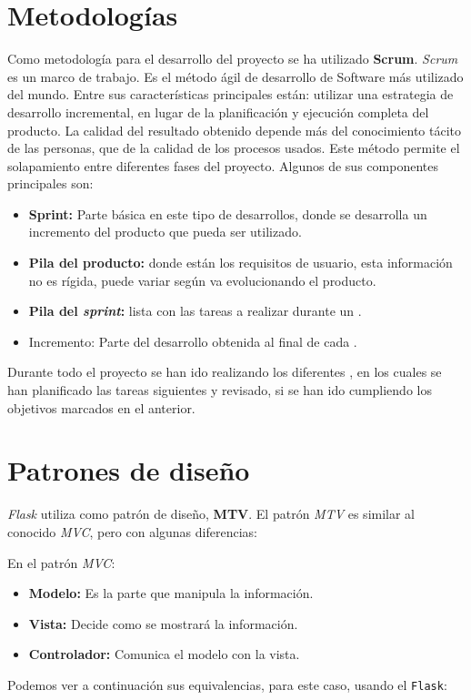 \section{Metodologías}

Como metodología para el desarrollo del proyecto se ha utilizado \textbf {Scrum}.
\emph{Scrum} es un marco de trabajo. Es el método ágil de desarrollo de Software más utilizado del mundo.
Entre sus características principales están:
utilizar una estrategia de desarrollo incremental, en lugar de la planificación y ejecución completa del producto. 
La calidad del resultado obtenido depende más del conocimiento tácito de las personas, que de la calidad de los procesos usados. 
Este método permite el solapamiento entre diferentes fases del proyecto.
Algunos de sus componentes principales son: 
\begin{itemize}
\item\textbf{Sprint:} Parte básica en este tipo de desarrollos, donde se desarrolla un incremento del producto que pueda ser utilizado.
\item\textbf{Pila del producto:} donde están los requisitos de usuario, esta información no es rígida, puede variar según va evolucionando el producto.
\item\textbf{Pila del \emph{sprint}:} lista con las tareas a realizar durante un .
\item{Incremento:} Parte del desarrollo obtenida al final de cada .
\end{itemize}
Durante todo el proyecto se han ido realizando los diferentes , en los cuales se han planificado las tareas siguientes y revisado, si se han ido cumpliendo los objetivos marcados en el  anterior.


\section{Patrones de diseño}
\emph{Flask} utiliza como patrón de diseño, \textbf {MTV}.
El patrón \emph{MTV} es similar al conocido \emph{MVC}, pero con algunas diferencias:

En el patrón \emph{MVC}:
\begin{itemize}
\item\textbf{Modelo:} Es la parte que manipula la información.
\item\textbf{Vista:} Decide como se mostrará la información.
\item\textbf{Controlador:} Comunica el modelo con la vista.
\end{itemize}
Podemos ver a continuación sus equivalencias, para este caso, usando el  \texttt{Flask}:

